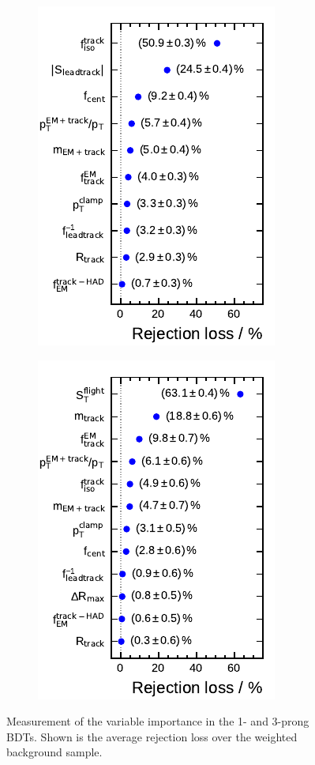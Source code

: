 \begin{figure}[htb]
  \centering
  \begin{subfigure}[t]{0.48\textwidth}
    \centering
    \includegraphics{./figures/bdt_perf/var_importance/1p_iter1.pdf}
  \end{subfigure}\hfill
  \begin{subfigure}[t]{0.48\textwidth}
    \centering
    \includegraphics{./figures/bdt_perf/var_importance/3p_iter1.pdf}
  \end{subfigure}
  \caption{Measurement of the variable importance in the 1- and 3-prong BDTs.
    Shown is the average rejection loss over the weighted background sample.}
  \label{fig:variable_importance}
\end{figure}

